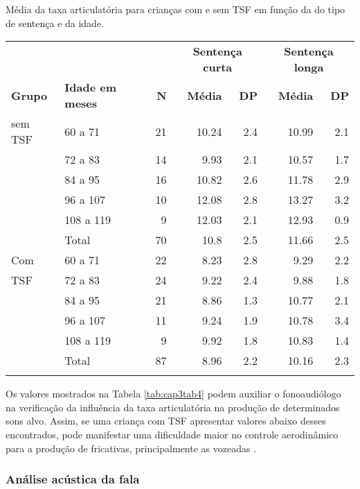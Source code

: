 \documentclass[output=paper,colorlinks,citecolor=brown,booklanguage=portuguese]{langscibook}
\begin{document}
\begin{Tabela}
\caption{Média da taxa articulatória para crianças com e sem TSF em função da do tipo de sentença e da idade.}
\label{tab:cap3tab4}


\begin{tabularx}{.9\textwidth}{llrrrrr}
\lsptoprule
 &&& \multicolumn{2}{c}{\textbf{Sentença curta}}& \multicolumn{2}{c}{\textbf{Sentença longa}}\\
 \cmidrule(lr){4-5}\cmidrule(lr){6-7}
 \textbf{Grupo} & \textbf{Idade em meses} & \textbf{N} & \textbf{Média} & \textbf{DP} & \textbf{Média} & \textbf{DP}\\
 \midrule
sem TSF & 60 a 71 & 21 & 10.24 & 2.4 & 10.99 & 2.1\\
& 72 a 83&	14&	9.93&	2.1&	10.57&	1.7\\
& 84 a 95&	16&	10.82&	2.6&	11.78&	2.9\\
&96 a 107&	10&	12.08&	2.8&	13.27&	3.2\\
&108 a 119&	9&	12.03&	2.1&	12.93&	0.9\\
&Total& 	70&	10.8&	2.5&	11.66&	2.5\\
\midrule
Com&	60 a 71&	22&	8.23&	2.8&	9.29&	2.2\\
\midrule
TSF&	72 a 83&	24&	9.22&	2.4&	9.88&	1.8\\
&84 a 95&	21&	8.86&	1.3&	10.77&	2.1\\
&96 a 107&	11&	9.24&	1.9&	10.78&	3.4\\
&108 a 119&	9&	9.92&	1.8&	10.83&	1.4\\
&Total& 	87&	8.96&	2.2&	10.16&	2.3\\
\lspbottomrule
\end{tabularx}
\parbox{.1\textwidth}{\raggedright\footnotesize\noindent{}}\parbox{.9\textwidth}{\raggedright\footnotesize{}}
\end{Tabela}


Os valores mostrados na Tabela \ref{tab:cap3tab4} podem auxiliar o fonoaudiólogo na verificação da influência da taxa articulatória na produção de determinados sons alvo. Assim, se uma criança com TSF apresentar valores abaixo desses encontrados, pode manifestar uma dificuldade maior no controle aerodinâmico para a produção de fricativas, principalmente as vozeadas \citep{Wertzner2016}.

\subsubsection{Análise acústica da fala}
\end{document}
